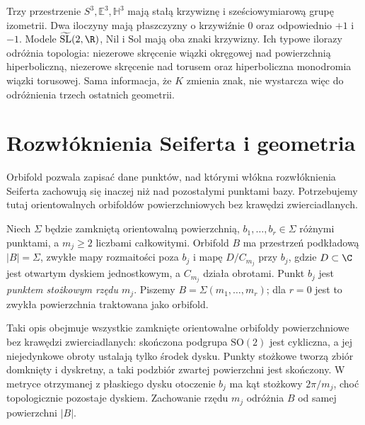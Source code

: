 \begin{uwaga}
\label{uw:thurston-eight-comparison}
Trzy przestrzenie $S^3,\mathbb E^3,\mathbb H^3$ mają stałą
krzywiznę i sześciowymiarową grupę izometrii. Dwa iloczyny
mają płaszczyzny o krzywiźnie $0$ oraz odpowiednio $+1$ i $-1$.
Modele $\widetilde{\mathrm{SL}}(2,\R)$, $\mathrm{Nil}$
i $\mathrm{Sol}$ mają oba znaki krzywizny. Ich typowe ilorazy
odróżnia topologia: niezerowe skręcenie wiązki okręgowej
nad powierzchnią hiperboliczną, niezerowe skręcenie nad torusem
oraz hiperboliczna monodromia wiązki torusowej.
Sama informacja, że $K$ zmienia znak, nie wystarcza więc
do odróżnienia trzech ostatnich geometrii.
\end{uwaga}

\section{Rozwłóknienia Seiferta i geometria}
\label{sec:thurston-seifert}

Orbifold pozwala zapisać dane punktów, nad którymi włókna
rozwłóknienia Seiferta zachowują się inaczej niż nad pozostałymi
punktami bazy. Potrzebujemy tutaj orientowalnych orbifoldów
powierzchniowych bez krawędzi zwierciadlanych.

\begin{definicja}
\label{def:thurston-orbifold-bazy}
Niech $\Sigma$ będzie zamkniętą orientowalną powierzchnią,
$b_1,\ldots,b_r\in\Sigma$ różnymi punktami, a $m_j\geq2$
liczbami całkowitymi. Orbifold $B$ ma przestrzeń podkładową
$|B|=\Sigma$, zwykłe mapy rozmaitości poza $b_j$ i mapę
$D/C_{m_j}$ przy $b_j$, gdzie $D\subset\C$ jest otwartym
dyskiem jednostkowym, a $C_{m_j}$ działa obrotami.
Punkt $b_j$ jest \emph{punktem stożkowym rzędu $m_j$}.
Piszemy $B=\Sigma(m_1,\ldots,m_r)$; dla $r=0$ jest to
zwykła powierzchnia traktowana jako orbifold.
\end{definicja}

Taki opis obejmuje wszystkie zamknięte orientowalne orbifoldy
powierzchniowe bez krawędzi zwierciadlanych: skończona podgrupa
$\mathrm{SO}(2)$ jest cykliczna, a jej niejedynkowe obroty
ustalają tylko środek dysku. Punkty stożkowe tworzą zbiór
domknięty i dyskretny, a taki podzbiór zwartej powierzchni
jest skończony.
W metryce otrzymanej z płaskiego dysku otoczenie $b_j$ ma
kąt stożkowy $2\pi/m_j$, choć topologicznie pozostaje dyskiem.
Zachowanie rzędu $m_j$ odróżnia $B$ od samej powierzchni $|B|$.

